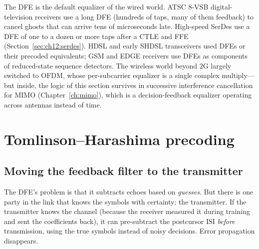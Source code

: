 \begin{inpractice}
The DFE is the default equalizer of the wired world. ATSC 8-VSB digital-television receivers use a
long DFE (hundreds of taps, many of them feedback) to cancel ghosts that can arrive tens of
microseconds late. High-speed SerDes use a DFE of one to a dozen or more taps after a CTLE and FFE
(Section~\ref{sec:ch12:serdes}). HDSL and early SHDSL transceivers used DFEs or their precoded
equivalents; GSM and EDGE receivers use DFEs as components of reduced-state sequence detectors. The
wireless world beyond 2G largely switched to OFDM, whose per-subcarrier equalizer is a single complex
multiply---but inside, the logic of this section survives in successive interference cancellation for
MIMO (Chapter~\ref{ch:mimo}), which is a decision-feedback equalizer operating across antennas instead of
time.
\end{inpractice}

\section{Tomlinson--Harashima precoding}
\label{sec:ch12:thp}

\subsection{Moving the feedback filter to the transmitter}

The DFE's problem is that it subtracts echoes based on \emph{guesses}. But there is one party in the
link that knows the symbols with certainty: the transmitter. If the transmitter knows the channel
(because the receiver measured it during training and sent the coefficients back), it can
pre-subtract the postcursor ISI \emph{before} transmission, using the true symbols instead of noisy
decisions. Error propagation disappears.

